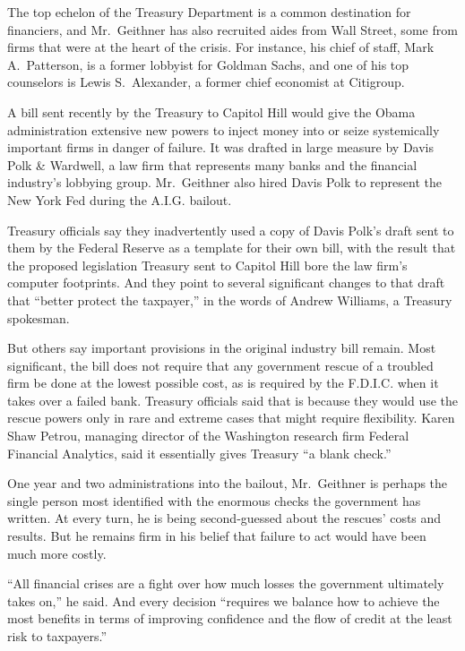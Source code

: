 \documentclass[12pt,a4paper,onecolumn]{article}
\begin{document}
The top echelon of the Treasury Department is a common destination for financiers, and Mr.~Geithner
has also recruited aides from Wall Street, some from firms that were at the heart of the crisis. For
instance, his chief of staff, Mark A.~Patterson, is a former lobbyist for Goldman Sachs, and one of
his top counselors is Lewis S.~Alexander, a former chief economist at Citigroup.

A bill sent recently by the Treasury to Capitol Hill would give the Obama administration extensive
new powers to inject money into or seize systemically important firms in danger of failure. It was
drafted in large measure by Davis Polk \& Wardwell, a law firm that represents many banks and the
financial industry's lobbying group. Mr.~Geithner also hired Davis Polk to represent the New York
Fed during the A.I.G. bailout.

Treasury officials say they inadvertently used a copy of Davis Polk's draft sent to them by the
Federal Reserve as a template for their own bill, with the result that the proposed legislation
Treasury sent to Capitol Hill bore the law firm's computer footprints. And they point to several
significant changes to that draft that ``better protect the taxpayer,'' in the words of Andrew
Williams, a Treasury spokesman.

But others say important provisions in the original industry bill remain. Most significant, the bill
does not require that any government rescue of a troubled firm be done at the lowest possible cost,
as is required by the F.D.I.C. when it takes over a failed bank. Treasury officials said that is
because they would use the rescue powers only in rare and extreme cases that might require
flexibility. Karen Shaw Petrou, managing director of the Washington research firm Federal Financial
Analytics, said it essentially gives Treasury ``a blank check.''

One year and two administrations into the bailout, Mr.~Geithner is perhaps the single person most
identified with the enormous checks the government has written. At every turn, he is being
second-guessed about the rescues' costs and results. But he remains firm in his belief that failure
to act would have been much more costly.

``All financial crises are a fight over how much losses the government ultimately takes on,'' he
said. And every decision ``requires we balance how to achieve the most benefits in terms of
improving confidence and the flow of credit at the least risk to taxpayers.''
\end{document}
